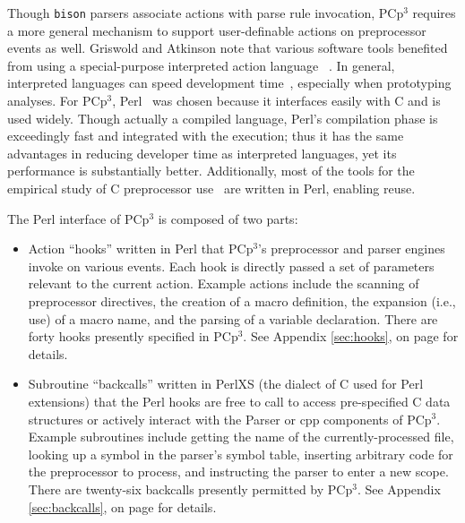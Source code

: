 \documentclass{article}
\newcommand{\pcp}{\mbox{\textsf{PCp}$^3$}}
\newcommand{\Cpp}{\mbox{\textsf{cpp}}}
\newcommand{\Perl}{\mbox{Perl}}
\newcommand{\C}{\mbox{C}}
\newcommand{\appendixref}[1]{Appendix \ref{#1}, on page \pageref{#1}}
\newcommand{\ie}{i.e.,}
\begin{document}
Though \texttt{bison} parsers associate actions with parse rule
invocation, \pcp{} requires a more general mechanism to support
user-definable actions on preprocessor events as well. Griswold and
Atkinson note that various software tools benefited from using a
special-purpose interpreted action language ~\cite{Griswold96}.  In
general, interpreted languages can speed development
time~\cite{Scripting}, especially when prototyping analyses. For \pcp{},
\Perl{}~\cite{Perl,Camel} was chosen because it interfaces easily with
\C{} and is used widely. Though actually a compiled language, \Perl{}'s
compilation phase is exceedingly fast and integrated with the execution;
thus it has the same advantages in reducing developer time as
interpreted languages, yet its performance is substantially better.
Additionally, most of the tools for the empirical study of \C{}
preprocessor use~\cite{EmpCpp} are written in \Perl{}, enabling reuse.

The \Perl{} interface of \pcp{} is composed of two parts:

\begin{itemize}
\item Action ``hooks'' written in \Perl{} that \pcp{}'s preprocessor and
      parser engines invoke on various events. Each hook is directly
      passed a set of parameters relevant to the current action.
      Example actions include the scanning of preprocessor directives,
      the creation of a macro definition, the expansion (\ie{} use) of a
      macro name, and the parsing of a variable declaration.  There are
      forty hooks presently specified in \pcp{}. See
      \appendixref{sec:hooks} for details.
\item Subroutine ``backcalls'' written in {PerlXS} (the dialect of \C{}
      used for \Perl{} extensions) that the \Perl{} hooks are free to
      call to access pre-specified \C{} data structures or actively
      interact with the Parser or \Cpp{} components of \pcp{}.  Example
      subroutines include getting the name of the currently-processed
      file, looking up a symbol in the parser's symbol table, inserting
      arbitrary code for the preprocessor to process, and instructing the
      parser to enter a new scope.  There are twenty-six backcalls
      presently permitted by \pcp{}.  See \appendixref{sec:backcalls}
      for details.
\end{itemize}
\end{document}
